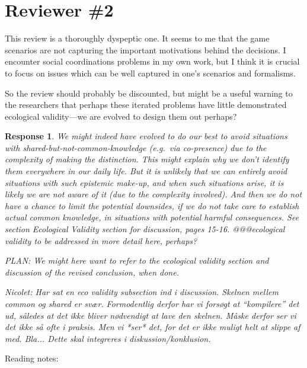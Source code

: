 \documentclass[a4paper]{article}
\newtheorem{response}{Response}
\newenvironment{robin}{\smallskip \noindent \color{red!10!green!50!blue}}{\color{black}\smallskip}
\begin{document}
\section*{Reviewer \#2}
This review is a thoroughly dyspeptic one. It seems to me that the game scenarios are not capturing the important motivations behind the decisions. I encounter social coordinations problems in my own work, but I think it is crucial to focus on issues which can be well captured in one's scenarios and formalisms.

So the review should probably be discounted, but might be a useful warning to the researchers that perhaps these iterated problems have little demonstrated ecological validity---we are evolved to design them out perhaps?

\begin{response}
We might indeed have evolved to do our best to avoid situations with shared-but-not-common-knowledge (e.g.\ via co-presence) due to the complexity of making the distinction. This might explain why we don't identify them everywhere in our daily life. But it is unlikely that we can entirely avoid situations with such epistemic make-up, and when such situations arise, it is likely we are not aware of it (due to the complexity involved). And then we do not have a chance to limit the potential downsides, if we do not take care to establish actual common knowledge, in situations with potential harmful consequences. See section Ecological Validity section for discussion, pages 15-16.
@@@ecological validity to be addressed in more detail here, perhaps?
  
PLAN: We might here want to refer to the ecological validity section and discussion of the revised conclusion, when done. 
  
 Nicolet: Har sat en eco validity subsection ind i discussion. Skelnen mellem common og shared er svær. Formodentlig derfor har vi forsøgt at ``kompilere'' det ud, således at det ikke bliver nødvendigt at lave den skelnen. Måske derfor ser vi det ikke så ofte i praksis. Men vi *ser* det, for det er ikke muligt helt at slippe af med. Bla... Dette skal integreres i diskussion/konklusion.
\end{response}


Reading notes:
\end{document}
